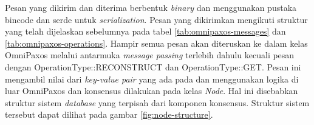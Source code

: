 Pesan yang dikirim dan diterima berbentuk \textit{binary} dan menggunakan pustaka bincode dan serde untuk \textit{serialization}. Pesan yang dikirimkan mengikuti struktur yang telah dijelaskan sebelumnya pada tabel \ref{tab:omnipaxos-messages} dan \ref{tab:omnipaxos-operations}. Hampir semua pesan akan diteruskan ke dalam kelas OmniPaxos melalui antarmuka \textit{message passing} terlebih dahulu kecuali pesan dengan OperationType::RECONSTRUCT dan OperationType::GET. Pesan ini mengambil nilai dari \textit{key-value pair} yang ada pada  dan menggunakan logika di luar OmniPaxos dan konsensus dilakukan pada kelas \textit{Node}. Hal ini disebabkan struktur sistem \textit{database} yang terpisah dari komponen konsensus. Struktur sistem tersebut dapat dilihat pada gambar \ref{fig:node-structure}. 